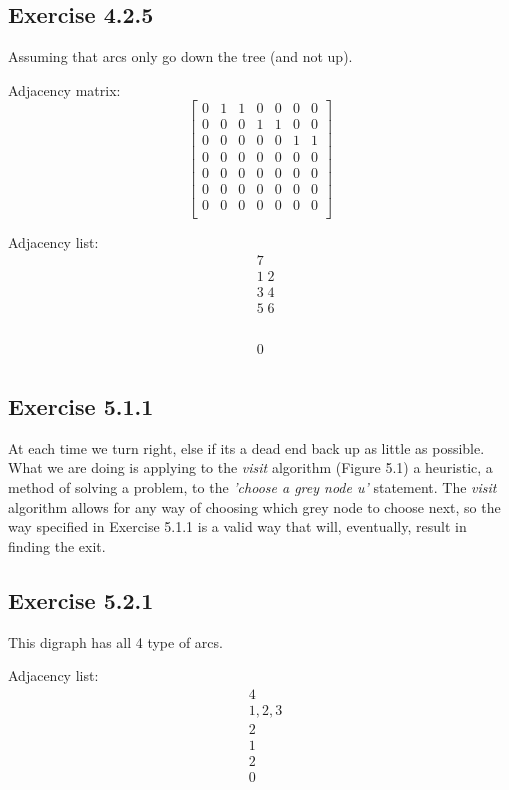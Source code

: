 \documentclass{article}
\begin{document}
\subsection*{Exercise 4.2.5}

Assuming that arcs only go down the tree (and not up).

Adjacency matrix:
\[\left[
	\begin{array}{ccccccc}
	0& 1& 1& 0& 0& 0& 0 \\
	0& 0& 0& 1& 1& 0& 0 \\
	0& 0& 0& 0& 0& 1& 1 \\
	0& 0& 0& 0& 0& 0& 0 \\
	0& 0& 0& 0& 0& 0& 0 \\
	0& 0& 0& 0& 0& 0& 0 \\
	0& 0& 0& 0& 0& 0& 0 \\
	\end{array}
\right]\]

Adjacency list:
\begin{align*}
&7 \\
&1\; 2 \\
&3\; 4 \\
&5\; 6 \\
&\\
&\\
&\\
&\\
&0 \\
\end{align*}


\subsection*{Exercise 5.1.1}

At each time we turn right, else if its a dead end back up as little as possible. What we are doing is applying to the \emph{visit} algorithm (Figure 5.1) a heuristic, a method of solving a problem, to the \emph{'choose a grey node \emph{u}'} statement. The \emph{visit} algorithm allows for any way of choosing which grey node to choose next, so the way specified in Exercise 5.1.1 is a valid way that will, eventually, result in finding the exit.


\subsection*{Exercise 5.2.1}

This digraph has all 4 type of arcs.

Adjacency list:
\begin{align*}
& 4 \\
& 1,2,3 \\
& 2 \\
& 1 \\
& 2 \\
& 0 \\
\end{align*}
\end{document}
